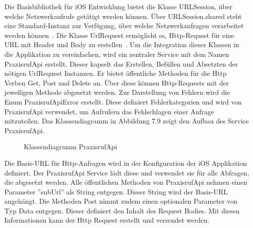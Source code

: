 Die Basisbibliothek für iOS Entwicklung bietet die Klasse URLSession, über welche Netzwerkaufrufe getätigt werden können.
Über URLSession.shared steht eine Standard-Instanz zur Verfügung, über welche Netzwerkanfragen verarbeitet werden können~\cite{ios_urlsession}.
Die Klasse UrlRequest ermöglicht es, Http-Request für eine URL mit Header und Body zu erstellen~\cite{ios_urlrequest}.
Um die Integration dieser Klassen in die Applikation zu vereinfachen, wird ein zentraler Service mit dem Namen PraxisrufApi erstellt.
Dieser kapselt das Erstellen, Befüllen und Absetzten der nötigen UrlRequest Instanzen.
Er bietet öffentliche Methoden für die Http Verben Get, Post und Delete an.
Über diese können Http-Requests mit der jeweiligen Methode abgesetzt werden.
Zur Darstellung von Fehlern wird die Enum PraxisrufApiError erstellt.
Diese definiert Fehlerkategorien und wird von PraxisrufApi verwendet, um Aufrufern das Fehlschlagen einer Anfrage mitzuteilen.
Das Klassendiagramm in Abbildung 7.9 zeigt den Aufbau des Service PraxisrufApi\@.

\begin{figure}[h]
    \centering
    \begin{minipage}[b]{0.8\textwidth}
        \caption{Klassendiagramm PraxisrufApi}
    \end{minipage}
\end{figure}

Die Basis-URL für Http-Anfragen wird in der Konfiguration der iOS Applikation definiert.
Der PraxisrufApi Service lädt diese und verwendet sie für alle Abfragen, die abgesetzt werden.
Alle öffentlichen Methoden von PraxisrufApi nehmen einen Parameter ''subUrl'' als String entgegen.
Dieser String wird der Basis-URL angehängt.
Die Methoden Post nimmt zudem einen optionalen Parameter von Typ Data entgegen.
Dieser definiert den Inhalt des Request Bodies.
Mit diesen Informationen kann der Http Request erstellt und versendet werden.

